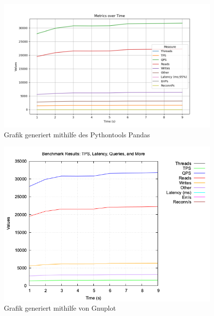 \begin{figure}[!ht]
    \centering
    \includegraphics[width=.8\textwidth]{PNGs/Demo/Summary}
    \caption[Pandas - Beispiel]{Grafik generiert mithilfe des Pythontools Pandas}
    \label{demo-pandas}
\end{figure}

\begin{figure}[!ht]
    \centering
    \includegraphics[width=.8\textwidth]{PNGs/Demo/sysbench_output}
    \caption[Gnuplot - Beispiel]{Grafik generiert mithilfe von Gnuplot}
    \label{demo-gnuplot}
\end{figure}


